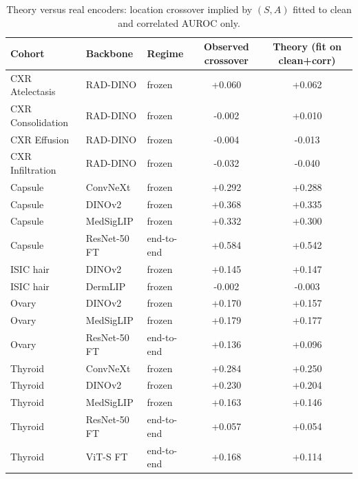 \begin{table}[H]\centering\small
\caption{Theory versus real encoders: location crossover implied by $(S,A)$ fitted to clean and correlated AUROC only.}\label{tab:theoryx}
\begin{tabular}{lllcc}\toprule
Cohort & Backbone & Regime & Observed crossover & Theory (fit on clean+corr) \\\midrule
CXR Atelectasis & RAD-DINO & frozen & +0.060 & +0.062 \\
CXR Consolidation & RAD-DINO & frozen & -0.002 & +0.010 \\
CXR Effusion & RAD-DINO & frozen & -0.004 & -0.013 \\
CXR Infiltration & RAD-DINO & frozen & -0.032 & -0.040 \\
Capsule & ConvNeXt & frozen & +0.292 & +0.288 \\
Capsule & DINOv2 & frozen & +0.368 & +0.335 \\
Capsule & MedSigLIP & frozen & +0.332 & +0.300 \\
Capsule & ResNet-50 FT & end-to-end & +0.584 & +0.542 \\
ISIC hair & DINOv2 & frozen & +0.145 & +0.147 \\
ISIC hair & DermLIP & frozen & -0.002 & -0.003 \\
Ovary & DINOv2 & frozen & +0.170 & +0.157 \\
Ovary & MedSigLIP & frozen & +0.179 & +0.177 \\
Ovary & ResNet-50 FT & end-to-end & +0.136 & +0.096 \\
Thyroid & ConvNeXt & frozen & +0.284 & +0.250 \\
Thyroid & DINOv2 & frozen & +0.230 & +0.204 \\
Thyroid & MedSigLIP & frozen & +0.163 & +0.146 \\
Thyroid & ResNet-50 FT & end-to-end & +0.057 & +0.054 \\
Thyroid & ViT-S FT & end-to-end & +0.168 & +0.114 \\
\bottomrule\end{tabular}\end{table}
